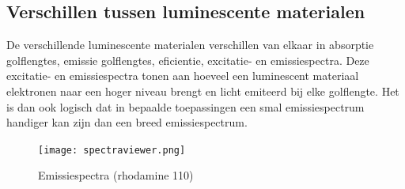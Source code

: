 \subsection{Verschillen tussen luminescente materialen}

De verschillende luminescente materialen verschillen van elkaar in absorptie golflengtes, emissie golflengtes, eficientie, excitatie- en emissiespectra. Deze excitatie- en emissiespectra tonen aan hoeveel een luminescent materiaal elektronen naar een hoger niveau brengt en licht emiteerd bij elke golflengte. Het is dan ook logisch dat in bepaalde toepassingen een smal emissiespectrum handiger kan zijn dan een breed emissiespectrum.

\begin{figure}[H]
    \centering
    \texttt{[image: spectraviewer.png]}
    \caption{Emissiespectra (rhodamine 110) ~\cite{FluorescenceSpectraViewer}}%
    \label{fig:rhodamine}
\end{figure}




